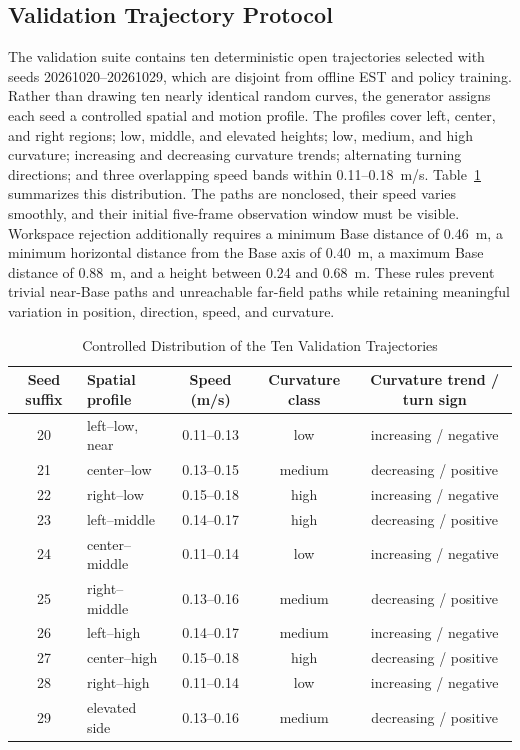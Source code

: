 \documentclass[conference]{IEEEtran}
\begin{document}
\subsection{Validation Trajectory Protocol}

The validation suite contains ten deterministic open trajectories selected with seeds 20261020--20261029, which are disjoint from offline EST and policy training. Rather than drawing ten nearly identical random curves, the generator assigns each seed a controlled spatial and motion profile. The profiles cover left, center, and right regions; low, middle, and elevated heights; low, medium, and high curvature; increasing and decreasing curvature trends; alternating turning directions; and three overlapping speed bands within 0.11--0.18~m/s. Table~\ref{tab:validation_profiles} summarizes this distribution. The paths are nonclosed, their speed varies smoothly, and their initial five-frame observation window must be visible. Workspace rejection additionally requires a minimum Base distance of 0.46~m, a minimum horizontal distance from the Base axis of 0.40~m, a maximum Base distance of 0.88~m, and a height between 0.24 and 0.68~m. These rules prevent trivial near-Base paths and unreachable far-field paths while retaining meaningful variation in position, direction, speed, and curvature.

\begin{table}[t]
\caption{Controlled Distribution of the Ten Validation Trajectories}
\label{tab:validation_profiles}
\centering
\footnotesize
\begin{tabular}{clccc}
\toprule
Seed suffix & Spatial profile & Speed (m/s) & Curvature class & Curvature trend / turn sign \\
\midrule
20 & left--low, near & 0.11--0.13 & low & increasing / negative \\
21 & center--low & 0.13--0.15 & medium & decreasing / positive \\
22 & right--low & 0.15--0.18 & high & increasing / negative \\
23 & left--middle & 0.14--0.17 & high & decreasing / positive \\
24 & center--middle & 0.11--0.14 & low & increasing / negative \\
25 & right--middle & 0.13--0.16 & medium & decreasing / positive \\
26 & left--high & 0.14--0.17 & medium & increasing / negative \\
27 & center--high & 0.15--0.18 & high & decreasing / positive \\
28 & right--high & 0.11--0.14 & low & increasing / negative \\
29 & elevated side & 0.13--0.16 & medium & decreasing / positive \\
\bottomrule
\end{tabular}
\end{table}
\end{document}
